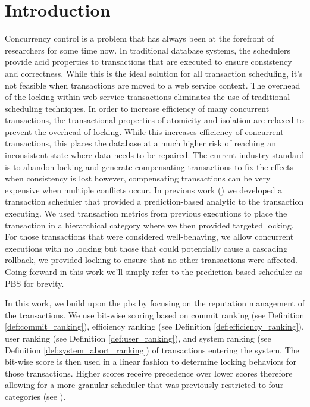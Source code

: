 \section{Introduction}
\label{sec:introduction}

Concurrency control is a problem that has always been at the forefront of researchers for some time now. In traditional database systems, the schedulers provide \gls{acid} properties to transactions that are executed to ensure consistency and correctness. While this is the ideal solution for all transaction scheduling, it's not feasible when transactions are moved to a web service context. The overhead of the locking within web service transactions eliminates the use of traditional scheduling techniques. In order to increase efficiency of many concurrent transactions, the transactional properties of atomicity and isolation are relaxed to prevent the overhead of locking. While this increases efficiency of concurrent transactions, this places the database at a much higher risk of reaching an inconsistent state where data needs to be repaired. The current industry standard is to abandon locking and generate compensating transactions to fix the effects when consistency is lost however, compensating transactions can be very expensive when multiple conflicts occur. In previous work (\cite{ravan_ensuring_2020}) we developed a transaction scheduler that provided a prediction-based analytic to the transaction executing. We used transaction metrics from previous executions to place the transaction in a hierarchical category where we then provided targeted locking. For those transactions that were considered well-behaving, we allow concurrent executions with no locking but those that could potentially cause a cascading rollback, we provided locking to ensure that no other transactions were affected. Going forward in this work we'll simply refer to the prediction-based scheduler as PBS for brevity. 

In this work, we build upon the \gls{pbs} by focusing on the reputation management of the transactions. We use bit-wise scoring based on commit ranking (see Definition \ref{def:commit_ranking}),  efficiency ranking (see Definition \ref{def:efficiency_ranking}), user ranking (see Definition \ref{def:user_ranking}), and system ranking (see Definition \ref{def:system_abort_ranking}) of transactions entering the system. The bit-wise score is then used in a linear fashion to determine locking behaviors for those transactions. Higher scores receive precedence over lower scores therefore allowing for a more granular scheduler that was previously restricted to four categories (see \cite{ravan_ensuring_2020}).

